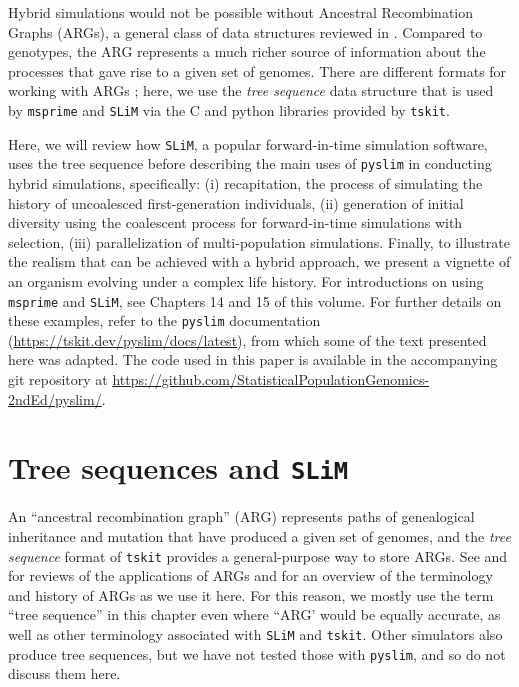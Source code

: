 \documentclass[12pt]{article}
\newcommand{\msprime}[0]{\texttt{msprime}\xspace}
\newcommand{\tskit}[0]{\texttt{tskit}\xspace}
\newcommand{\slim}[0]{\texttt{SLiM}\xspace}
\newcommand{\pyslim}[0]{\texttt{pyslim}\xspace}
\begin{document}

Hybrid simulations would not be possible without Ancestral Recombination Graphs (ARGs), 
a general class of data structures reviewed in \citet{wong_general_2024}.
Compared to genotypes,
the ARG represents a much richer source of information about the processes that gave rise to a given set of genomes.
There are different formats for working with ARGs \citep{palamara2016argon,dehaas2024enabling,parida2011minimal,gunnarsson2024scalable};
here, we use the \emph{tree sequence} data structure \citep{kelleher_efficient_2016,ralph_efficiently_2020}
that is used by \msprime and \slim via the C and python libraries provided by \tskit.

Here, we will review how \slim, a popular forward-in-time simulation software, uses the tree sequence before describing
the main uses of \pyslim in conducting hybrid simulations, specifically:
(i) recapitation, the process of simulating the history of uncoalesced first-generation individuals,
(ii) generation of initial diversity using the coalescent process for forward-in-time simulations with selection,
(iii) parallelization of multi-population simulations.
Finally, to illustrate the realism that can be achieved with a hybrid approach, we present a vignette of an organism evolving under a complex life history.
For introductions on using \msprime and \slim,
see Chapters 14 and 15 of this volume.
For further details on these examples,
refer to the \pyslim{} documentation (\url{https://tskit.dev/pyslim/docs/latest}),
from which some of the text presented here was adapted.
The code used in this paper is available in the accompanying git repository at
\url{https://github.com/StatisticalPopulationGenomics-2ndEd/pyslim/}.

\section{Tree sequences and \slim}
An ``ancestral recombination graph'' (ARG)
represents paths of genealogical inheritance and mutation that have produced a given set of genomes,
and the \emph{tree sequence} format of \tskit provides a general-purpose way to store ARGs.
See \cite{lewanski2024introduction} and \citet{brandt2022evaluation} for reviews of the applications of ARGs
and \citet{wong_general_2024} for an overview of the terminology and history of ARGs as we use it here.
For this reason, we mostly use the term ``tree sequence'' in this chapter even where ``ARG'
would be equally accurate, as well as other terminology associated with \slim and \tskit \citep{kelleher_efficient_2016,ralph_efficiently_2020,wong_general_2024}.
Other simulators also produce tree sequences,
but we have not tested those with \pyslim, and so do not discuss them here.
\end{document}
